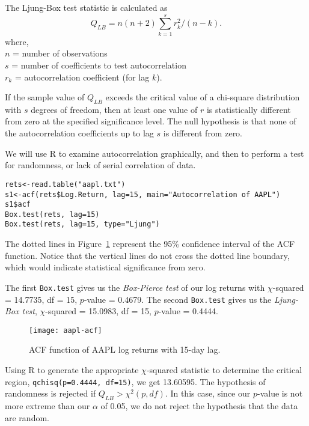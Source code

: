 The Ljung-Box test statistic is calculated as
\begin{equation}
Q_{LB}=n(n+2)\sum_{k=1}^s r_k^2/(n-k).
\label{eq:Ljung-Box}
\end{equation}
where, \\
$n$ = number of observations \\
$s$ = number of coefficients to test autocorrelation \\
$r_k$ = autocorrelation coefficient (for lag $k$).
\bigskip

If the sample value of $Q_{LB}$ exceeds the critical value of a chi-square distribution with $s$ degrees of freedom, then at least one value of $r$ is statistically different from zero at the specified significance level. The null hypothesis is that none of the autocorrelation coefficients up to lag $s$ is different from zero.

We will use R to examine autocorrelation graphically, and then to perform a test for randomness, or lack of serial correlation of data.
\begin{verbatim}
rets<-read.table("aapl.txt")
s1<-acf(rets$Log.Return, lag=15, main="Autocorrelation of AAPL")
s1$acf
Box.test(rets, lag=15)
Box.test(rets, lag=15, type="Ljung")
\end{verbatim}

The dotted lines in Figure~\ref{figure:aapl-acf} represent the 95\% confidence interval of the ACF function. Notice that the vertical lines do not cross the dotted line boundary, which would indicate statistical significance from zero.

The first \texttt{Box.test} gives us the \emph{Box-Pierce test} of our log returns with $\chi$-squared = 14.7735, df = 15, $p$-value = 0.4679. The second \texttt{Box.test} gives us the \emph{Ljung-Box test}, $\chi$-squared = 15.0983, df = 15, $p$-value = 0.4444.

\begin{figure}[tb]
  \centering
  \texttt{[image: aapl-acf]}
  \caption{ACF function of AAPL log returns with 15-day lag.}
  \label{figure:aapl-acf}
\end{figure}

Using R to generate the appropriate $\chi$-squared statistic to determine the critical region, \texttt{qchisq(p=0.4444, df=15)}, we get 13.60595. The hypothesis of randomness is rejected if $Q_{LB} > \chi^2(p, df)$. In this case, since our $p$-value is not more extreme than our $\alpha$ of 0.05, we do not reject the hypothesis that the data are random.

